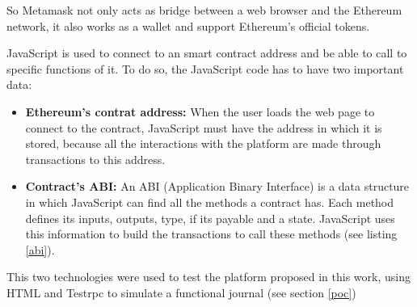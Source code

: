 So Metamask not only acts as bridge between a web browser and the Ethereum
network, it also works as a wallet and support Ethereum's official tokens.

JavaScript is used to connect to an smart contract address and be able to call
to specific functions of it. To do so, the JavaScript code has to have two
important data:

\begin{itemize}
\item \textbf{Ethereum's contrat address:} When the user loads the web page to
  connect to the contract, JavaScript must have the address in which it is
  stored, because all the interactions with the platform are made through
  transactions to this address.
\item \textbf{Contract's ABI:} An ABI (Application Binary Interface) is a data
  structure in which JavaScript can find all the methods a contract has. Each
  method defines its inputs, outputs, type, if its payable and a state.
  JavaScript uses this information to build the transactions to call these
  methods (see listing \ref{abi}).

\end{itemize}

This two technologies were used to test the platform proposed in this work,
using HTML and Testrpc to simulate a functional journal (see section \ref{poc})





